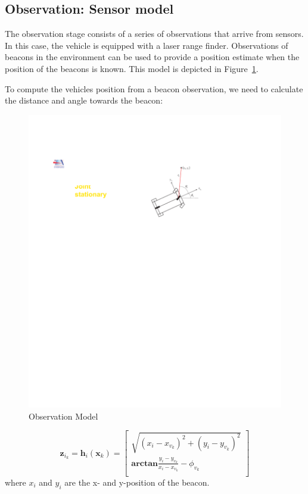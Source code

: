 \documentclass[a4, 10pt]{article}
\begin{document}
\subsection{Observation: Sensor model}
The observation stage consists of a series of observations that arrive
from sensors. In this case, the vehicle is equipped with a laser range
finder. Observations of beacons in the environment can be used to
provide a position estimate when the position of the beacons is
known. This model is depicted in Figure~\ref{f:obmodel}.

To compute the vehicles position from a beacon observation, we need to
calculate the distance and angle towards the beacon:

\begin{figure}[h]
\begin{center}
\includegraphics[]{sensormodel}
\caption{Observation Model}
\label{f:obmodel}
\end{center}
\end{figure}

\begin{equation}
\mathbf{z}_{i_k} = \mathbf{h}_i(\mathbf{x}_{k}) = \left[
\begin{array}{c}
\sqrt{(x_i - x_{v_k})^2 + (y_i - y_{v_k})^2}  \\
\mathbf{arctan}\frac{y_i-y_{v_k}}{x_i-x_{v_k}} - \phi_{v_k}\\
\end{array}
\right]
\end{equation}
where $x_i$ and $y_i$ are the x- and y-position of the beacon.
\end{document}
